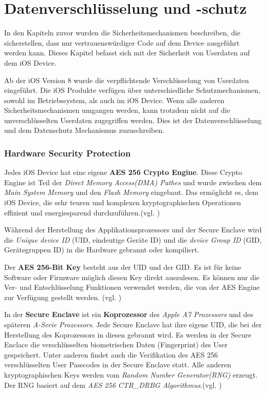 \section{Datenverschlüsselung und -schutz}
\label{sec:EncryptionandDataProtection}

In den Kapiteln zuvor wurden die Sicherheitsmechanismen beschreiben, die sicherstellen, dass nur vertrauenswürdiger Code auf dem Device ausgeführt werden kann. Dieses Kapitel befasst sich mit der Sicherheit von Userdaten auf dem iOS Device. 

Ab der iOS Version 8 wurde die verpflichtende Verschlüsselung von Userdaten eingeführt. Die iOS Produkte verfügen über unterschiedliche Schutzmechanismen, sowohl im Betriebssystem, als auch im iOS Device. Wenn alle anderen Sicherheitsmechanismen umgangen werden, kann trotzdem nicht auf die unverschlüsselten Userdaten zugegriffen werden. Dies ist der Datenverschlüsselung und dem Datenschutz Mechanismus zuzuschreiben.

\subsubsection{Hardware Security Protection}
\label{sec:HardwareSecProtection}

Jedes iOS Device hat eine eigene \textbf{AES 256 Crypto Engine}. Diese Crypto Engine ist Teil der \textit{\glqq Direct Memory Access(DMA) Pathes\grqq{}} und wurde zwischen dem \textit{\glqq Main System Memory\grqq{}} und den \textit{\glqq Flash Memory\grqq{}} eingebaut. Das ermöglicht es, dem iOS Device, die sehr teuren und komplexen kryptographischen Operationen effizient und energiesparend durchzuführen.(vgl. \cite{iOSSec[5], iOSSec[2],iOSSec[1], Apple[4], Apple[5], Apple[6], Apple[3]})

Während der Herstellung des Applikationsprozessors und der Secure Enclave wird die \textit{\glqq Unique device ID\grqq{}} (UID, eindeutige Geräte ID) und die \textit{\glqq device Group ID\grqq{}} (GID, Gerätegruppen ID) in die Hardware gebrannt oder kompiliert.  \par 
Der \textbf{AES 256-Bit Key} besteht aus der UID und der GID. Es ist für keine Software oder Firmware möglich diesen Key direkt auszulesen. Es können nur die Ver- und Entschlüsselung Funktionen verwendet werden, die von der AES Engine zur Verfügung gestellt werden. (vgl. \cite{iOSSec[5], iOSSec[2],iOSSec[1], Apple[4], Apple[5], Apple[6], Apple[3]})

In der \textbf{Secure Enclave} ist ein \textbf{Koprozessor} des \textit{\glqq Apple A7 Prozessors\grqq{}} und des späteren \textit{\glqq A-Serie Prozessors\grqq}. Jede Secure Enclave hat ihre eigene UID, die bei der Herstellung des Koprozessors in diesen gebrannt wird. Es werden in der Secure Enclace die verschlüsselten biometrischen Daten (Fingerprint) des User gespeichert. Unter anderen findet auch die Verifikation des AES 256 verschlüsselten User Passcodes in der Secure Enclave statt. Alle anderen kryptographischen Keys werden vom  \textit{\glqq Random Number Generator(RNG)\grqq{}} erzeugt. Der RNG basiert auf dem \textit{\glqq AES 256 CTR\_DRBG Algorithmus\grqq{}}.(vgl. \cite{iOSSec[5], iOSSec[2],iOSSec[1], Apple[4], Apple[5], Apple[6], Apple[3]})

